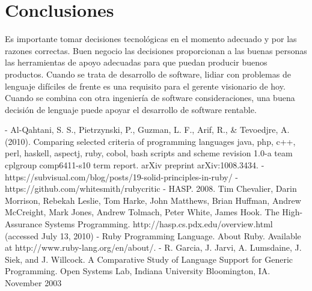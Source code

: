 \documentclass[twoside,twocolumn]{article}
\begin{document}
\section{Conclusiones}
Es importante tomar decisiones tecnológicas en el momento adecuado y por las razones correctas. Buen negocio
las decisiones proporcionan a las buenas personas las herramientas de apoyo adecuadas para que puedan producir buenos productos.
Cuando se trata de desarrollo de software, lidiar con problemas de lenguaje difíciles de frente es una
requisito para el gerente visionario de hoy. Cuando se combina con otra ingeniería de software
consideraciones, una buena decisión de lenguaje puede apoyar el desarrollo de software rentable.



\begin{thebibliography}{99} %

 
\newblock - Al-Qahtani, S. S., Pietrzynski, P., Guzman, L. F., Arif, R., & Tevoedjre, A. (2010). Comparing selected criteria of programming languages java, php, c++, perl, haskell, aspectj, ruby, cobol, bash scripts and scheme revision 1.0-a team cplgroup comp6411-s10 term report. arXiv preprint arXiv:1008.3434.
\newblock - https://subvisual.com/blog/posts/19-solid-principles-in-ruby/
\newblock - https://github.com/whitesmith/rubycritic
\newblock - HASP. 2008. Tim Chevalier, Darin Morrison, Rebekah Leslie, Tom Harke, John Matthews, Brian Huffman, Andrew McCreight, Mark Jones, Andrew Tolmach, Peter White, James Hook. The High-Assurance Systems Programming.  http://hasp.cs.pdx.edu/overview.html (accessed July 13, 2010)
\newblock - Ruby Programming Language. About Ruby. Available at http://www.ruby-lang.org/en/about/. 
\newblock - R. Garcia, J. Jarvi, A. Lumsdaine, J. Siek, and J. Willcock. A Comparative Study of Language Support for Generic Programming. Open Systems Lab, Indiana University Bloomington, IA. November 2003
\newblock 
\end{thebibliography}

\end{document}
